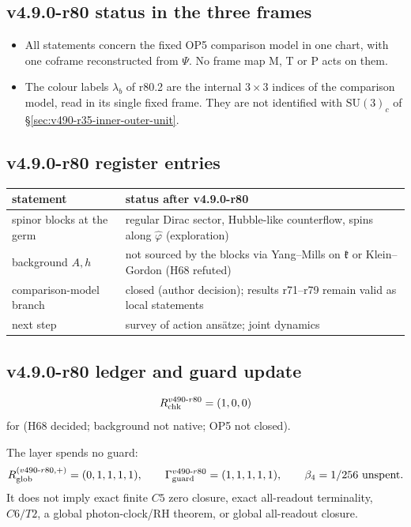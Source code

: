 \subsection*{v4.9.0-r80 status in the three frames}
\label{subsec:v490-r80-frames}

\begin{itemize}[leftmargin=2em]
\item All statements concern the fixed OP5 comparison model in one chart, with one coframe reconstructed from \(\Psi\).  No
frame map M, T or P acts on them.
\item The colour labels \(\lambda_b\) of r80.2 are the internal \(3\times3\) indices of the comparison model, read in its
single fixed frame.  They are not identified with \(\mathrm{SU}(3)_c\) of \S\ref{sec:v490-r35-inner-outer-unit}.
\end{itemize}

\subsection*{v4.9.0-r80 register entries}
\label{subsec:v490-r80-register}

\begin{center}
\small
\begin{tabular}{@{}>{\raggedright\arraybackslash}p{}>{\raggedright\arraybackslash}p{}@{}}
\toprule
statement & status after v4.9.0-r80\\
\midrule
spinor blocks at the germ & regular Dirac sector, Hubble-like counterflow, spins along \(\hat\varphi\) (exploration)\\
background \(A,h\) & not sourced by the blocks via Yang--Mills on \(\mathfrak k\) or Klein--Gordon (H68 refuted)\\
comparison-model branch & closed (author decision); results r71--r79 remain valid as local statements\\
next step & survey of action ansätze; joint dynamics\\
\bottomrule
\end{tabular}
\end{center}

\subsection*{v4.9.0-r80 ledger and guard update}
\label{subsec:v490-r80-ledger-guard}

\[
R_{\rm chk}^{v490\text{-}r80}=(1,0,0)
\]
for (H68 decided; background not native; OP5 not closed).

The layer spends no guard:
\[
R_{\rm glob}^{(v490\text{-}r80,+)}=(0,1,1,1,1),
\qquad
\Gamma_{\rm guard}^{v490\text{-}r80}=(1,1,1,1,1),
\qquad
\beta_4=1/256\ \text{unspent}.
\]
It does not imply exact finite \(C5\) zero closure, exact all-readout terminality,
\(C6/T2\), a global photon-clock/RH theorem, or global all-readout closure.
